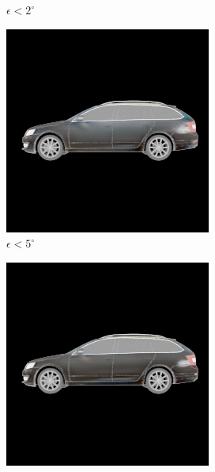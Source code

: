 \begin{figure}
\begin{subfigure}[t]{0.19\linewidth}
        \caption{$\epsilon < 2^\circ$}
    \end{subfigure}
    \begin{subfigure}[t]{0.19\linewidth}
        \centering
       \includegraphics[width=\linewidth]{graphics/pose_5.png}
        \caption{$\epsilon < 5^\circ$}
    \end{subfigure}
    \begin{subfigure}[t]{0.19\linewidth}
        \centering
        \includegraphics[width=\linewidth]{graphics/pose_10.png}

\end{subfigure}
\end{figure}
